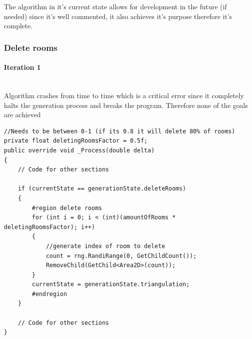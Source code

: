 \documentclass{article}
\newcommand{\myparagraph}[1]{\paragraph{#1}\mbox{}\\} %
\begin{document}
The algorithm in it's current state allows for development in the future (if needed) since it's well commented, it also achieves it's purpose therefore it's complete. 

\subsubsection{Delete rooms}
\myparagraph{Iteration 1}
Algorithm crashes from time to time which is a critical error since it completely halts the generation process and breaks the program. Therefore none of the goals are achieved
\begin{lstlisting}
//Needs to be between 0-1 (if its 0.8 it will delete 80% of rooms)
private float deletingRoomsFactor = 0.5f; 
public override void _Process(double delta)
{
    // Code for other sections

    if (currentState == generationState.deleteRooms)
    {
        #region delete rooms
        for (int i = 0; i < (int)(amountOfRooms * deletingRoomsFactor); i++)
        {
        	//generate index of room to delete
            count = rng.RandiRange(0, GetChildCount());
            RemoveChild(GetChild<Area2D>(count));
        }
        currentState = generationState.triangulation;
        #endregion
    }

    // Code for other sections
}
\end{lstlisting}
\end{document}
